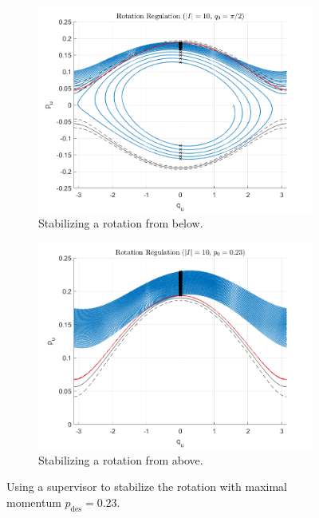 \documentclass[journal,twoside,web]{ieeecolor}
\begin{document}
\begin{figure}
    \centering
    \begin{subfigure}[t]{0.49\linewidth}
        \includegraphics[width=\linewidth]{acrobot_rot_orbit_1.png}
        \caption{Stabilizing a rotation from below.}
        \label{fig:acrobot-rot-reg-in}
    \end{subfigure}
    \begin{subfigure}[t]{0.49\linewidth}
        \includegraphics[width=\linewidth]{acrobot_rot_orbit_2.png}
        \caption{Stabilizing a rotation from above.}
        \label{fig:acrobot-rot-reg-diss}
    \end{subfigure}
    \caption{Using a supervisor to stabilize the rotation with maximal momentum
    \(p_\text{des} = 0.23\).}
    \label{fig:acrobot-rot-reg}
\end{figure}
\end{document}
